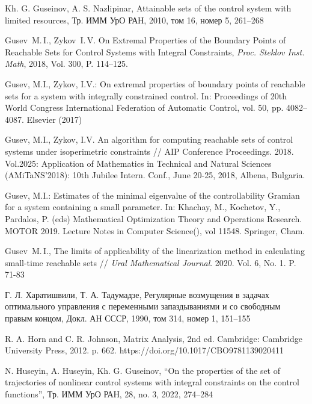 \documentclass[../main.tex]{subfiles}
\begin{document}
\begin{thebibliography}{99}
Kh. G. Guseinov, A. S. Nazlipinar, Attainable sets of the control system with limited resources, Тр. ИММ УрО РАН, 2010, том 16, номер 5, 261–268


Gusev~M.\,I., Zykov~I.\,V. On Extremal Properties of the Boundary Points of Reachable Sets for Control Systems with Integral Constraints, \emph{Proc. Steklov Inst. Math}, 2018, Vol. 300, P. 114--125. 

Gusev, M.I., Zykov, I.V.: On extremal properties of boundary points of reachable sets for a system with integrally constrained control. In: Proceedings of 20th World Congress International Federation of Automatic Control, vol. 50, pp. 4082--4087. Elsevier (2017) 

Gusev, M.I., Zykov, I.V.
An algorithm for computing reachable sets of control systems under isoperimetric constraints // AIP Conference Proceedings. 
2018. 
Vol.2025: Application of Mathematics in Technical and Natural Sciences 
(AMiTaNS'2018): 10th Jubilee Intern. Conf.,
June 20-25, 2018, Albena, Bulgaria.

Gusev, M.I.: Estimates of the minimal eigenvalue of the controllability Gramian for a system containing a small parameter.  In: 
Khachay, M., Kochetov, Y., Pardalos, P. (eds) Mathematical Optimization Theory and Operations Research. MOTOR 
2019. Lecture Notes in Computer Science(), vol 11548. Springer, Cham. 


Gusev~M.\,I., The limits of applicability of the linearization method in calculating small-time reachable sets // \emph{Ural Mathematical Journal}. 2020. Vol. 6, No. 1. P. 71-83

Г. Л. Харатишвили, Т. А. Тадумадзе, Регулярные возмущения в задачах оптимального управления с переменными запаздываниями и со свободным правым концом, Докл. АН СССР, 1990, том 314, номер 1, 151–155

R. A. Horn and C. R. Johnson, Matrix Analysis, 2nd ed. Cambridge: Cambridge University Press, 2012. p. 662. https://doi.org/10.1017/CBO9781139020411

N. Huseyin, A. Huseyin, Kh. G. Guseinov, “On the properties of the set of trajectories of nonlinear control systems with integral constraints on the control functions”, Тр. ИММ УрО РАН, 28, no. 3, 2022, 274–284


\end{thebibliography}
\end{document}
